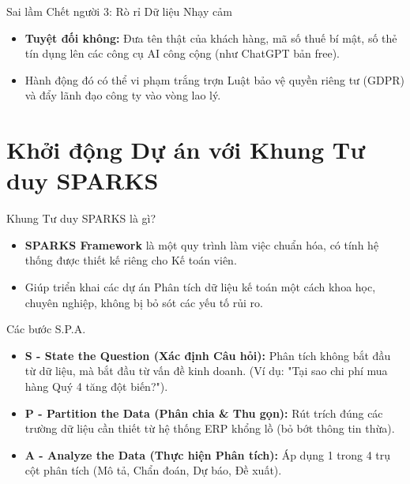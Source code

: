 \documentclass[aspectratio=169,12pt]{beamer}
\begin{document}
\begin{frame}{Sai lầm Chết người 3: Rò rỉ Dữ liệu Nhạy cảm}
    \begin{itemize}
        \item \textbf{Tuyệt đối không:} Đưa tên thật của khách hàng, mã số thuế bí mật, số thẻ tín dụng lên các công cụ AI công cộng (như ChatGPT bản free).
        \item Hành động đó có thể vi phạm trắng trợn Luật bảo vệ quyền riêng tư (GDPR) và đẩy lãnh đạo công ty vào vòng lao lý.
    \end{itemize}
\end{frame}


\section{Khởi động Dự án với Khung Tư duy SPARKS}
\begin{frame}
    \tableofcontents[currentsection]
\end{frame}

\begin{frame}{Khung Tư duy SPARKS là gì?}
    \begin{itemize}
        \item \textbf{SPARKS Framework} là một quy trình làm việc chuẩn hóa, có tính hệ thống được thiết kế riêng cho Kế toán viên.
        \item Giúp triển khai các dự án Phân tích dữ liệu kế toán một cách khoa học, chuyên nghiệp, không bị bỏ sót các yếu tố rủi ro.
    \end{itemize}
\end{frame}

\begin{frame}{Các bước S.P.A.}
    \begin{itemize}
        \item \textbf{S - State the Question (Xác định Câu hỏi):} Phân tích không bắt đầu từ dữ liệu, mà bắt đầu từ vấn đề kinh doanh. (Ví dụ: "Tại sao chi phí mua hàng Quý 4 tăng đột biến?").
        \item \textbf{P - Partition the Data (Phân chia \& Thu gọn):} Rút trích đúng các trường dữ liệu cần thiết từ hệ thống ERP khổng lồ (bỏ bớt thông tin thừa).
        \item \textbf{A - Analyze the Data (Thực hiện Phân tích):} Áp dụng 1 trong 4 trụ cột phân tích (Mô tả, Chẩn đoán, Dự báo, Đề xuất).
    \end{itemize}
\end{frame}
\end{document}
